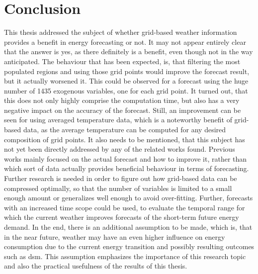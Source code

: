 \chapter{Conclusion}
\label{ch:Conclusion}

This thesis addressed the subject of whether grid-based weather information provides a benefit in energy forecasting or not. It may not appear entirely clear that the answer is yes, as there definitely is a benefit, even though not in the way anticipated. The behaviour that has been expected, is, that filtering the most populated regions and using those grid points would improve the forecast result, but it actually worsened it. This could be observed for a forecast using the huge number of 1435 exogenous variables, one for each grid point. It turned out, that this does not only highly comprise the computation time, but also has a very negative impact on the accuracy of the forecast. Still, an improvement can be seen for using \eg averaged temperature data, which is a noteworthy benefit of grid-based data, as the average temperature can be computed for any desired composition of grid points. It also needs to be mentioned, that this subject has not yet been directly addressed by any of the related works found. Previous works mainly focused on the actual forecast and how to improve it, rather than which sort of data actually provides beneficial behaviour in terms of forecasting. Further research is needed in order to figure out how grid-based data can be compressed optimally, so that the number of variables is limited to a small enough amount or generalizes well enough to avoid over-fitting. Further, forecasts with an increased time scope could be used, to evaluate the temporal range for which the current weather improves forecasts of the short-term future energy demand. In the end, there is an additional assumption to be made, which is, that in the near future, weather may have an even higher influence on energy consumption due to the current energy transition and possibly resulting outcomes such as \gls{dsm}. This assumption emphasizes the importance of this research topic and also the practical usefulness of the results of this thesis.\\



